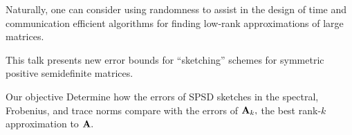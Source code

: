 \documentclass[xcolor=x11names,compress,ignorenonframetext,10pt]{beamer}
\let\bbordermatrix\bordermatrix
\renewcommand{\(}{\begin{columns}}
\renewcommand{\)}{\end{columns}}
\newcommand{\<}[1]{\begin{column}{#1}}
\renewcommand{\>}{\end{column}}
\begin{document}
\begin{frame}
 Naturally, one can consider using randomness to assist in the design of time and communication efficient algorithms
 for finding low-rank approximations of large matrices. 
 \vspace{0.7em}
 
 This talk presents new error bounds for 
 ``sketching'' schemes for symmetric positive semidefinite matrices.
 
\begin{block}{Our objective}
 Determine how the errors of SPSD sketches in the spectral, Frobenius, and trace norms compare with the errors of $\mathbf{A}_k,$ the 
 best rank-$k$ approximation to $\mathbf{A}.$
\end{block}

\end{frame}

% 
% 
\end{document}
